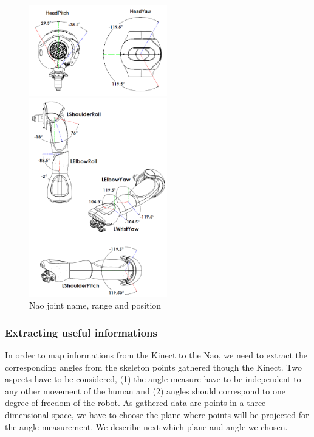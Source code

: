 \documentclass[a4paper,11pt]{article}
\begin{document}
\begin{figure}[H]
	\centering
	\begin{minipage}[c]{.46\linewidth}
		\centering
		\includegraphics[width=6cm]{hardware_headjoint.png}
	\end{minipage}
	\begin{minipage}[c]{.46\linewidth}
		\centering
		\includegraphics[width=6cm]{hardware_larmjoint.png}
	\end{minipage}
	\caption{Nao joint name, range and position}
	\label{NaoJoint}
\end{figure}

\subsubsection*{Extracting useful informations}

In order to map informations from the Kinect to the Nao, we need to extract the corresponding angles from the skeleton points gathered though the Kinect. Two aspects have to be considered, (1) the angle measure have to be independent to any other movement of the human and (2) angles should correspond to one degree of freedom of the robot. As gathered data are points in a three dimensional space, we have to choose the plane where points will be projected for the angle measurement. We describe next which plane and angle we chosen.
\end{document}
